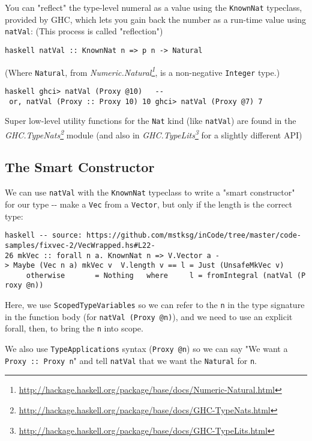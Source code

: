 \documentclass[]{article}
\renewcommand{\href}[2]{#2\footnote{\url{#1}}}
\begin{document}
You can "reflect" the type-level numeral as a value using the \texttt{KnownNat}
typeclass, provided by GHC, which lets you gain back the number as a run-time
value using \texttt{natVal}: (This process is called "reflection")

\texttt{haskell\ natVal\ ::\ KnownNat\ n\ =\textgreater{}\ p\ n\ -\textgreater{}\ Natural}

(Where \texttt{Natural}, from
\emph{\href{http://hackage.haskell.org/package/base/docs/Numeric-Natural.html}{Numeric.Natural}},
is a non-negative \texttt{Integer} type.)

\texttt{haskell\ ghci\textgreater{}\ natVal\ (Proxy\ @10)\ \ \ -\/-\ or,\ natVal\ (Proxy\ ::\ Proxy\ 10)\ 10\ ghci\textgreater{}\ natVal\ (Proxy\ @7)\ 7}

Super low-level utility functions for the \texttt{Nat} kind (like
\texttt{natVal}) are found in the
\emph{\href{http://hackage.haskell.org/package/base/docs/GHC-TypeNats.html}{GHC.TypeNats}}
module (and also in
\emph{\href{http://hackage.haskell.org/package/base/docs/GHC-TypeLits.html}{GHC.TypeLits}}
for a slightly different API)

\subsection{The Smart Constructor}

We can use \texttt{natVal} with the \texttt{KnownNat} typeclass to write a
"smart constructor" for our type -\/- make a \texttt{Vec} from a
\texttt{Vector}, but only if the length is the correct type:

\texttt{haskell\ -\/-\ source:\ https://github.com/mstksg/inCode/tree/master/code-samples/fixvec-2/VecWrapped.hs\#L22-26\ mkVec\ ::\ forall\ n\ a.\ KnownNat\ n\ =\textgreater{}\ V.Vector\ a\ -\textgreater{}\ Maybe\ (Vec\ n\ a)\ mkVec\ v\ \textbar{}\ V.length\ v\ ==\ l\ =\ Just\ (UnsafeMkVec\ v)\ \ \ \ \ \ \ \ \ \textbar{}\ otherwise\ \ \ \ \ \ \ =\ Nothing\ \ \ where\ \ \ \ \ l\ =\ fromIntegral\ (natVal\ (Proxy\ @n))}

Here, we use \texttt{ScopedTypeVariables} so we can refer to the \texttt{n} in
the type signature in the function body (for \texttt{natVal\ (Proxy\ @n)}), and
we need to use an explicit forall, then, to bring the \texttt{n} into scope.

We also use \texttt{TypeApplications} syntax (\texttt{Proxy\ @n}) so we can say
"We want a \texttt{Proxy\ ::\ Proxy\ n}" and tell \texttt{natVal} that we want
the \texttt{Natural} for \texttt{n}.
\end{document}
